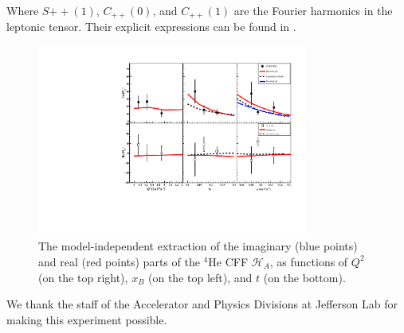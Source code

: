 \documentclass[nofootinbib,twocolumn,showpacs,prl,superscriptaddress,secnumarabic,amssymb,nobibnotes,aps,floatfix]{revtex4}
\begin{document}
Where $S{++}(1)$, $C_{++}(0)$, and $C_{++}(1)$ are the Fourier harmonics in the 
leptonic tensor. Their explicit expressions can be found in .  



\begin{figure}[tb]
\includegraphics[width=8.9cm]{figs/Coherent_CFF.pdf}
\vspace{-0.9cm}
\caption{The model-independent extraction of the imaginary (blue points) and
real (red points) parts of the $^4$He CFF $\mathcal{H}_A$, as functions of
$Q^{2}$ (on the top right), $x_B$ (on the top left), and $t$ (on the bottom).}
\label{fig:CFF_HA}
\end{figure}











We thank the staff of the Accelerator and Physics Divisions
at Jefferson Lab for making this experiment possible.
\end{document}
